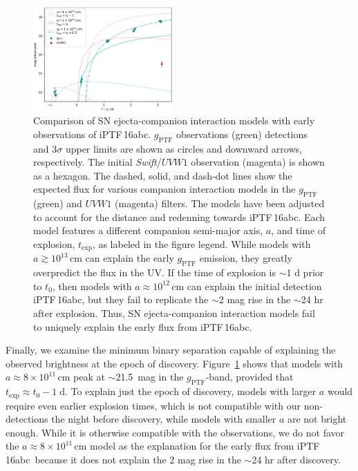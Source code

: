 \documentclass[twocolumn]{aastex61}
\newcommand{\abc}{iPTF\,16abc}
\begin{document}
\begin{figure}[!thb]
  \centering
  \includegraphics[width=0.48\textwidth]{companion_lc.pdf}
  \caption{Comparison of SN ejecta-companion interaction models 
  with early observations of \abc. $g_\mathrm{PTF}$ observations 
  (green) detections and 3$\sigma$ upper limits are shown 
  as circles and downward arrows, respectively. The initial 
  \textit{Swift}/$UVW1$ observation (magenta) is shown as a 
  hexagon.
  The dashed, solid, and dash-dot lines show the expected flux 
  for various companion interaction models in 
  the $g_\mathrm{PTF}$ (green) and $UVW1$ (magenta) filters. The 
  models have been adjusted to account for the distance and 
  redenning towards \abc. Each 
  model features a different companion semi-major axis, $a$, and 
  time of explosion, $t_\mathrm{exp}$, as labeled in the figure 
  legend. While models with $a \gtrsim 10^{13} \, \mathrm{cm}$ can 
  explain the early $g_\mathrm{PTF}$ emission, they greatly 
  overpredict the flux in the UV. If the time of explosion is 
  $\sim$1 d prior to $t_0$, then models with $a \approx 10^{12} \, 
  \mathrm{cm}$ can explain the initial detection \abc, but they 
  fail to replicate the $\sim$2 mag rise in the $\sim$24 hr after 
  explosion. Thus, SN ejecta-companion interaction models fail
  to uniquely explain the early flux from \abc.
  }
  \label{fig:SN-companion}
\end{figure}

Finally, we examine the minimum binary separation capable of explaining the observed brightness at the epoch of discovery. Figure~\ref{fig:SN-companion} shows that models with $a \approx 8 \times 10^{11} \, \mathrm{cm}$ peak at $\sim$21.5~mag in the $g_\mathrm{PTF}$-band, provided that $t_\mathrm{exp} \approx t_0 - 1 \; \mathrm{d}$. To explain just the epoch of discovery, models with larger $a$ would require even earlier explosion times, which is not compatible with our non-detections the night before discovery, while models with smaller $a$ are not bright enough. While it is otherwise compatible with the observations, we do not favor the $a \approx 8 \times 10^{11} \, \mathrm{cm}$ model as the explanation for the early flux from \abc\ because it does not explain the 2 mag rise in the $\sim$24 hr after discovery. 
\end{document}
